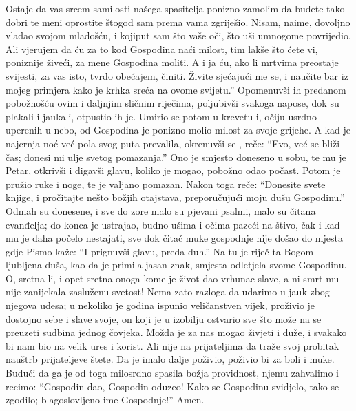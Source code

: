 \documentclass[a5paper,twoside]{article}
\begin{document}
\pend
\pstart
Ostaje da vas srcem samilosti našega spasitelja ponizno zamolim da budete tako dobri te meni oprostite štogod sam prema vama zgriješio.  Nisam, naime, dovoljno vladao svojom mladošću, i kojiput sam što vaše oči, što uši umnogome povrijedio.  Ali vjerujem da ću za to kod Gospodina naći milost, tim lakše što ćete vi, poniznije živeći, za mene Gospodina moliti.  A i ja ću, ako li mrtvima preostaje svijesti, za vas isto, tvrdo obećajem, činiti.  Živite sjećajući me se, i naučite bar iz mojeg primjera kako je krhka sreća na ovome svijetu.''  
\pend
\pstart
Opomenuvši ih predanom pobožnošću ovim i daljnjim sličnim riječima, poljubivši svakoga napose, dok su plakali i jaukali, otpustio ih je.  Umirio se potom u krevetu i, očiju usrdno uperenih u nebo, od Gospodina je ponizno molio milost za svoje grijehe.  A kad je najcrnja noć već pola svog puta prevalila, okrenuvši se , reče: ``Evo, već se bliži čas; donesi mi ulje svetog pomazanja.''  Ono je smjesto doneseno u sobu, te mu je Petar, otkrivši i digavši glavu, koliko je mogao, pobožno odao počast. Potom je pružio ruke i noge, te je valjano pomazan. Nakon toga reče: ``Donesite svete knjige, i pročitajte nešto božjih otajstava, preporučujući moju dušu Gospodinu.''  Odmah su donesene, i sve do zore malo su pjevani psalmi, malo su čitana evanđelja; do konca je ustrajao, budno ušima i očima pazeći na štivo, čak i kad mu je daha počelo nestajati, sve dok čitač muke gospodnje nije došao do mjesta gdje Pismo kaže: ``I prignuvši glavu, preda duh.''  Na tu je riječ ta Bogom ljubljena duša, kao da je primila jasan znak, smjesta odletjela svome Gospodinu.
\pend
\pstart
O, sretna li, i opet sretna onoga kome je život dao vrhunac slave, a ni smrt mu nije zanijekala zasluženu svetost! Nema zato razloga da udarimo u jauk zbog njegova udesa; u nekoliko je godina ispunio veličanstven vijek, proživio je dostojno sebe i slave svoje, on koji je u izobilju ostvario sve što može na se preuzeti sudbina jednog čovjeka.  Možda je za nas mogao živjeti i duže, i svakako bi nam bio na velik ures i korist.  Ali nije na prijateljima da traže svoj probitak nauštrb prijateljeve štete.  Da je imalo dalje poživio, poživio bi za boli i muke.  Budući da ga je od toga milosrdno spasila božja providnost, njemu zahvalimo i recimo: ``Gospodin dao, Gospodin oduzeo! Kako se Gospodinu svidjelo, tako se zgodilo; blagoslovljeno ime Gospodnje!'' Amen.


\pend



\endnumbering
\end{document}
